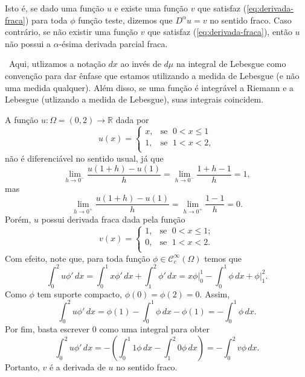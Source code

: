 \documentclass[a4paper, 11pt]{book}
\theoremstyle{definition}
\newcommand{\obs}{\noindent{\textbf{\textcolor{black}{\sffamily Observação:}}}~}
\newcommand{\bR}{\mathbb{R}}
\newcommand{\cC}{\mathcal{C}}
\begin{document}
Isto é, se dado uma função $u$ e existe uma função $v$ que satisfaz (\ref{eq:derivada-fraca}) para toda $\phi$ função teste, dizemos que $D^\alpha u = v$ no sentido fraco.
Caso contrário, se não existir uma função $v$ que satisfaz (\ref{eq:derivada-fraca}), então $u$ não possui a $\alpha$-ésima derivada parcial fraca.

\obs Aqui, utlizamos a notação $dx$ ao invés de $d\mu$ na integral de Lebesgue como convenção para dar ênfase que estamos utilizando a medida de Lebesgue (e não uma medida qualquer).
Além disso, se uma função é integrável a Riemann e a Lebesgue (utlizando a medida de Lebesgue), suas integrais coincidem.

\begin{ex} \label{ex:derivada-fraca-R}
    A função $u : \Omega  =(0,2) \to \bR$ dada por
    \[
        u(x) = \left\{
            \begin{array}{rl}
                x, & \!\text{se }\; 0 < x \leqslant 1\\
                1, & \!\text{se }\; 1 < x < 2,\\
            \end{array}
        \right.
    \]
    não é diferenciável no sentido usual, já que
    \[
        \lim_{h\to 0^-} \frac{u(1 + h) - u(1)}{h} = \lim_{h \to 0^-} \frac{1 + h -1}{h} = 1,
    \]
    mas
    \[
        \lim_{h\to 0^+} \frac{u(1 + h) - u(1)}{h} = \lim_{h \to 0^+} \frac{1 -1}{h} = 0.
    \]
    Porém, $u$ possui derivada fraca dada pela função
    \[
        v(x) = \left\{
            \begin{array}{rl}
                1, & \text{se }\; 0 < x \leqslant 1;\\
                0, & \text{se }\; 1 < x < 2.\\
            \end{array}
        \right.
    \]
    Com efeito, note que, para toda função $\phi \in \cC^\infty_c(\Omega)$ temos que
    \[
        \int_0^2 u \phi' \,dx = \int_0^1 x \phi' \,dx + \int_1^2 \phi' \,dx = x \phi \bigg|_0^1 - \int_0^1 \phi \,dx + \phi \bigg|_1^2.
    \]
    Como $\phi$ tem suporte compacto, $\phi(0) = \phi(2) = 0$. Assim,
    \[
        \int_0^2 u \phi' \,dx = \phi(1) - \int_0^1 \phi \,dx - \phi(1) = -\int_0^1 \phi \,dx.
    \]
    Por fim, basta escrever $0$ como uma integral para obter
    \[
        \int_0^2 u \phi' \,dx = - \left(  \int_0^1 1\phi \, dx - \int_1^2 0\phi \,dx  \right) = -\int_0^2 v \phi \,dx.
    \]
    Portanto, $v$ é a derivada de $u$ no sentido fraco.
\end{ex}
\end{document}
